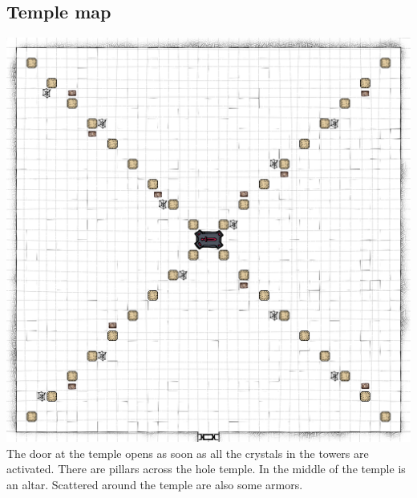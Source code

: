 \documentclass[a4paper,10pt,twoside,twocolumn,bg=print]{dndbook} %
\begin{document}
		\subsection{Temple map}
		\includegraphics[width=\linewidth]{Temple.png}
		\vspace*{4cm}\linebreak
		The door at the temple opens as soon as all the crystals in the towers are activated. There are pillars across the hole temple. In the middle of the temple is an altar. Scattered around the temple are also some armors.
		\vfill
		\pagebreak
\end{document}

